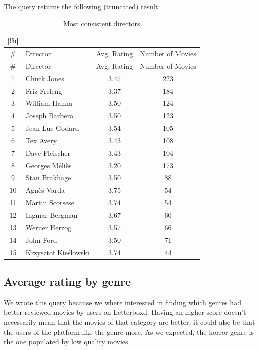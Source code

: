 \documentclass{Configuration_Files/PoliMi3i_thesis}
\begin{document}
The query returns the following (truncated) result:

\begin{longtable}{|c|l|c|c|}[!h]
\caption{Most consistent directors} \\
\hline
\# & Director & Avg. Rating & Number of Movies \\
\hline
\endfirsthead
\hline
\# & Director & Avg. Rating & Number of Movies \\
\hline
\endhead
\hline
\endfoot
\hline
\endlastfoot

1 & Chuck Jones        & 3.47 & 223 \\
2 & Friz Freleng       & 3.37 & 184 \\
3 & William Hanna      & 3.50 & 124 \\
4 & Joseph Barbera     & 3.50 & 123 \\
5 & Jean-Luc Godard    & 3.54 & 105 \\
6 & Tex Avery          & 3.43 & 108 \\
7 & Dave Fleischer     & 3.43 & 104 \\
8 & Georges Méliès     & 3.20 & 173 \\
9 & Stan Brakhage      & 3.50 & 88  \\
10 & Agnès Varda       & 3.75 & 54  \\
11 & Martin Scorsese   & 3.74 & 54  \\
12 & Ingmar Bergman    & 3.67 & 60  \\
13 & Werner Herzog     & 3.57 & 66  \\
14 & John Ford         & 3.50 & 71  \\
15 & Krzysztof Kieślowski & 3.74 & 44  \\
\end{longtable}

\subsection{Average rating by genre}

We wrote this query because we where interested in finding which genres had better reviewed movies by users on Letterboxd. Having an higher score doesn't necessarily mean that the movies of that category are better, it could alse be that the users of the platform like the genre more.
As we expected, the horror genre is the one populated by low quality movies.

\inputminted[frame=single,framesep=10pt,breaklines]{cypher}{letterboxd/queries/query3.cypher}
\end{document}
